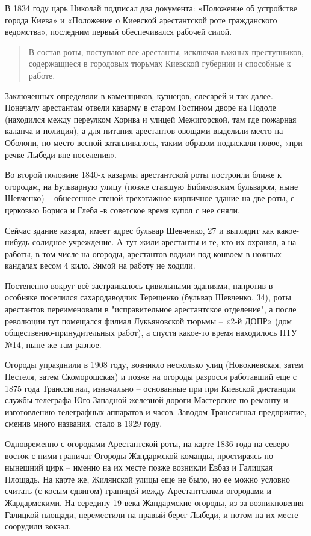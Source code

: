 В 1834 году царь Николай подписал два документа: «Положение об устройстве города Киева» и «Положение о Киевской арестантской роте гражданского ведомства», последним первый обеспечивался рабочей силой.

\begin{quotation}
В состав роты, поступают все арестанты, исключая важных преступников, содержащиеся в городовых тюрьмах Киевской губернии и способные к работе.
\end{quotation}

Заключенных определяли в каменщиков, кузнецов, слесарей и так далее. Поначалу арестантам отвели казарму в старом Гостином дворе на Подоле (находился между переулком Хорива и улицей Межигорской, там где пожарная каланча и полиция), а для питания арестантов овощами выделили место на Оболони, но место весной затапливалось, таким образом подыскали новое, «при речке Лыбеди вне поселения».

Во второй половине 1840-х казармы арестантской роты построили ближе к огородам, на Бульварную улицу (позже ставшую Бибиковским бульваром, ныне Шевченко) – обнесенное стеной трехэтажное кирпичное здание на две роты, с церковью Бориса и Глеба -в советское время купол с нее сняли.  

Сейчас здание казарм, имеет адрес бульвар Шевченко, 27 и выглядит как какое-нибудь солидное учреждение. А тут жили арестанты и те, кто их охранял, а на работы, в том числе на огороды, арестантов водили под конвоем в ножных кандалах весом 4 кило. Зимой на работу не ходили.

Постепенно вокруг всё застраивалось цивильными зданиями, напротив в особняке поселился сахародаводчик Терещенко (бульвар Шевченко, 34), роты арестантов переименовали в "исправительное арестантское отделение", а после революции тут помещался филиал Лукьяновской тюрьмы – «2-й ДОПР» (дом общественно-принудительных работ), а спустя какое-то время находилось ПТУ №14, ныне же там разное.

Огороды упразднили в 1908 году, возникло несколько улиц (Новокиевская, затем Пестеля, затем Скоморошская) и позже на огороды разросся работавший еще с 1875 года Транссигнал, изначально – основанные при при Киевской дистанции службы телеграфа Юго-Западной железной дороги Мастерские по ремонту и изготовлению телеграфных аппаратов и часов. Заводом Транссигнал предприятие, сменив много названия, стало в 1929 году.

Одновременно с огородами Арестантской роты, на карте 1836 года на северо-восток с ними граничат Огороды Жандармской команды, простираясь по нынешний цирк – именно на их месте позже возникли Евбаз и Галицкая Площадь. На карте же, Жилянской улицы еще не было, но ее можно условно считать (с косым сдвигом) границей между Арестантскими огородами и Жардармскими. На середину 19 века Жандармские огороды, из-за возникновения Галицкой площади, переместили на правый берег Лыбеди, и потом на их месте соорудили вокзал.\\

